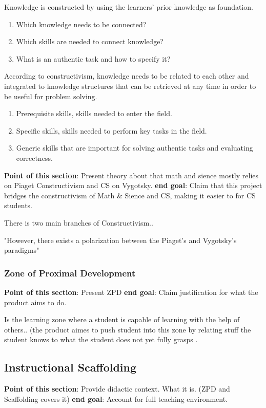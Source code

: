 Knowledge is constructed by using the learners’ prior knowledge as foundation.

\begin{enumerate}
    \item Which knowledge needs to be connected?
    \item Which skills are needed to connect knowledge?
    \item What is an authentic task and how to specify it?
\end{enumerate}

According to constructivism, knowledge needs to be
related to each other and integrated to knowledge structures
that can be retrieved at any time in order to be useful for
problem solving. 

\begin{enumerate}
    \item Prerequisite skills, skills needed to enter the field.
    \item Specific skills, skills needed to perform key tasks in the field.
    \item Generic skills that are important for solving authentic tasks and evaluating correctness.
\end{enumerate}

\textbf{Point of this section}: Present theory about that math and sience mostly relies on Piaget Constructivism and CS on Vygotsky.
\textbf{end goal}: Claim that this project bridges the constructivism of Math \& Sience and CS, making it easier to for CS students.
\newline


There is two main branches of Constructivism..

"However, there exists a polarization between the Piaget’s
and Vygotsky’s paradigms"

\subsubsection{Zone of Proximal Development}
\textbf{Point of this section}: Present ZPD
\textbf{end goal}: Claim justification for what the product aims to do.
\newline

Is the learning zone where a student is capable of learning with the help of others.. (the product aimes to push student into this zone by relating stuff the student knows to what the student does not yet fully grasps \cite{vygotski_1978}.


\subsection{Instructional Scaffolding}
\textbf{Point of this section}: Provide didactic context. What it is. (ZPD and Scaffolding covers it)
\textbf{end goal}: Account for full teaching environment. 
\newline

